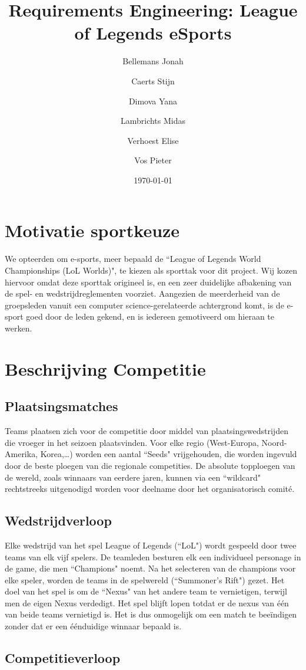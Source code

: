 \documentclass[12pt,a4paper]{article}
\title{Requirements Engineering: League of Legends eSports}
\author{Bellemans Jonah \and Caerts Stijn \and Dimova Yana \and Lambrichts Midas \and Verhoest Elise \and Vos Pieter}
\date{\today}
\begin{document}
	\maketitle
	\newpage
	\tableofcontents
	\newpage
	\section{Motivatie sportkeuze}
		We opteerden om e-sports, meer bepaald de ``League of Legends World Championships (LoL Worlds)", te kiezen als sporttak voor dit project. Wij kozen hiervoor omdat deze sporttak origineel is, en een zeer duidelijke afbakening van de spel- en wedstrijdreglementen voorziet. Aangezien de meerderheid van de groepsleden vanuit een computer science-gerelateerde achtergrond komt, is de e-sport goed door de leden gekend, en is iedereen gemotiveerd om hieraan te werken.
	\section{Beschrijving Competitie}
		\subsection{Plaatsingsmatches}
			Teams plaatsen zich voor de competitie door middel van plaatsingswedstrijden die vroeger in het seizoen plaatsvinden. Voor elke regio (West-Europa, Noord-Amerika, Korea,\dots) worden een aantal ``Seeds" vrijgehouden, die worden ingevuld door de beste ploegen van die regionale competities. De absolute topploegen van de wereld, zoals winnaars van eerdere jaren, kunnen via een ``wildcard" rechtstreeks uitgenodigd worden voor deelname door het organisatorisch comité.
		\subsection{Wedstrijdverloop}
			Elke wedstrijd van het spel League of Legends (``LoL") wordt gespeeld door twee teams van elk vijf spelers. De teamleden besturen elk een individueel personage in de game, die men ``Champions" noemt. Na het selecteren van de champions voor elke speler, worden de teams in de spelwereld (``Summoner's Rift") gezet. Het doel van het spel is om de ``Nexus" van het andere team te vernietigen, terwijl men de eigen Nexus verdedigt. Het spel blijft lopen totdat er de nexus van één van beide teams vernietigd is. Het is dus onmogelijk om een match te beeïndigen zonder dat er een éénduidige winnaar bepaald is.
		\subsection{Competitieverloop}
\end{document}
